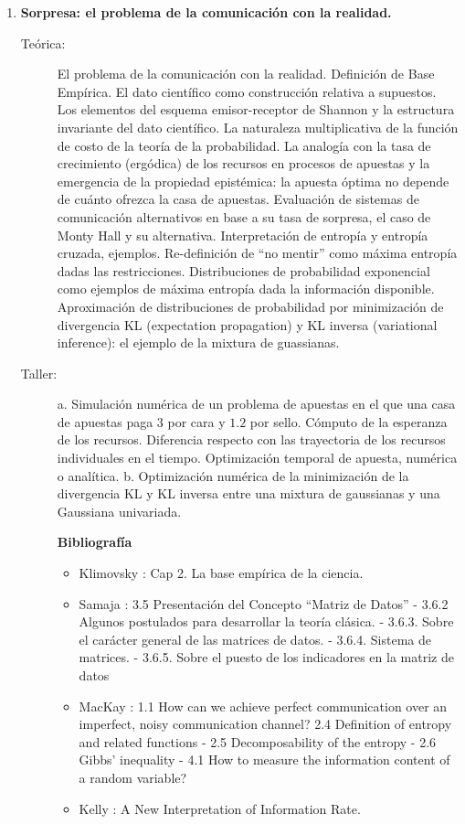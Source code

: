 \documentclass[11pt]{article}
\begin{document}
\begin{enumerate}
\item \textbf{Sorpresa: el problema de la comunicación con la realidad.}
\vspace{-0.15cm}
\begin{description}
\item[Teórica:]
El problema de la comunicación con la realidad.
Definición de Base Empírica.
El dato científico como construcción relativa a supuestos.
Los elementos del esquema emisor-receptor de Shannon y la estructura invariante del dato científico.
La naturaleza multiplicativa de la función de costo de la teoría de la probabilidad.
La analogía con la tasa de crecimiento (ergódica) de los recursos en procesos de apuestas y la emergencia de la propiedad epistémica: la apuesta óptima no depende de cuánto ofrezca la casa de apuestas.
Evaluación de sistemas de comunicación alternativos en base a su tasa de sorpresa, el caso de Monty Hall y su alternativa.
Interpretación de entropía y entropía cruzada, ejemplos.
Re-definición de ``no mentir'' como máxima entropía dadas las restricciones.
Distribuciones de probabilidad exponencial como ejemplos de máxima entropía dada la información disponible.
Aproximación de distribuciones de probabilidad por minimización de divergencia KL (expectation propagation) y KL inversa (variational inference): el ejemplo de la mixtura de guassianas.
\item[Taller:] a. Simulación numérica de un problema de apuestas en el que una casa de apuestas paga $3$ por cara y $1.2$ por sello. Cómputo de la esperanza de los recursos. Diferencia respecto con las trayectoria de los recursos individuales en el tiempo. Optimización temporal de apuesta, numérica o analítica. b. Optimización numérica de la minimización de la divergencia KL y KL inversa entre una mixtura de gaussianas y una Gaussiana univariada.
\item[] \textbf{Bibliografía}
\begin{itemize}
\item Klimovsky \cite{klimovsky1994-desventuras}: Cap 2. La base empírica de la ciencia.
\item Samaja \cite{samaja1999-epistemologiaMetodologia}: 3.5 Presentación del Concepto ``Matriz de Datos'' - 3.6.2 Algunos postulados para desarrollar la teoría clásica. - 3.6.3. Sobre el carácter general de las matrices de datos. - 3.6.4. Sistema de matrices. - 3.6.5. Sobre el puesto de los indicadores en la matriz de datos
\item MacKay \cite{mackay2003-informationInferenceLearning}: 1.1 How can we achieve perfect communication over an imperfect, noisy communication channel? 2.4 Definition of entropy and related functions - 2.5 Decomposability of the entropy - 2.6 Gibbs' inequality - 4.1 How to measure the information content of a random variable?
\item Kelly \cite{kelly1956-informationRate}: A New Interpretation of Information Rate.
\end{itemize}
\end{description}


\end{enumerate}
\end{document}
